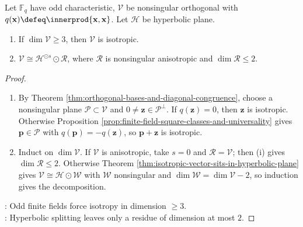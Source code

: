 \begin{lemma} \label{lem:odd-finite-field-anisotropic-residue-bound} \\
Let $\mathbb{F}_q$ have odd characteristic, $\mathcal{V}$ be nonsingular orthogonal with $q(\mathbf{x})\defeq\innerprod{\mathbf{x},\mathbf{x}}$. Let $\mathcal{H}$ be hyperbolic plane.
\begin{enumerate}[label=(\roman*)]
\setlength{\itemsep}{0pt}
\item If $\dim\mathcal{V}\geq3$, then $\mathcal{V}$ is isotropic.
\item $\mathcal{V}\cong\mathcal{H}^{\odot s}\odot\mathcal{R}$, where $\mathcal{R}$ is nonsingular anisotropic and $\dim\mathcal{R}\leq2$.
\end{enumerate}
\begin{proof}
\begin{enumerate}[label=(\roman*)]
\setlength{\itemsep}{0pt}
\item By Theorem \ref{thm:orthogonal-bases-and-diagonal-congruence}, choose a nonsingular plane $\mathcal{P}\subset\mathcal{V}$ and $0\neq\mathbf{z}\in\mathcal{P}^{\perp}$. If $q(\mathbf{z})=0$, then $\mathbf{z}$ is isotropic. Otherwise Proposition \ref{prop:finite-field-square-classes-and-universality} gives $\mathbf{p}\in\mathcal{P}$ with $q(\mathbf{p})=-q(\mathbf{z})$, so $\mathbf{p}+\mathbf{z}$ is isotropic.
\item Induct on $\dim\mathcal{V}$. If $\mathcal{V}$ is anisotropic, take $s=0$ and $\mathcal{R}=\mathcal{V}$; then (i) gives $\dim\mathcal{R}\leq2$. Otherwise Theorem \ref{thm:isotropic-vector-sits-in-hyperbolic-plane} gives $\mathcal{V}\cong\mathcal{H}\odot\mathcal{W}$ with $\mathcal{W}$ nonsingular and $\dim\mathcal{W}=\dim\mathcal{V}-2$, so induction gives the decomposition.
\end{enumerate}
: Odd finite fields force isotropy in dimension $\geq3$.\\
: Hyperbolic splitting leaves only a residue of dimension at most $2$.
\end{proof}
\end{lemma}

